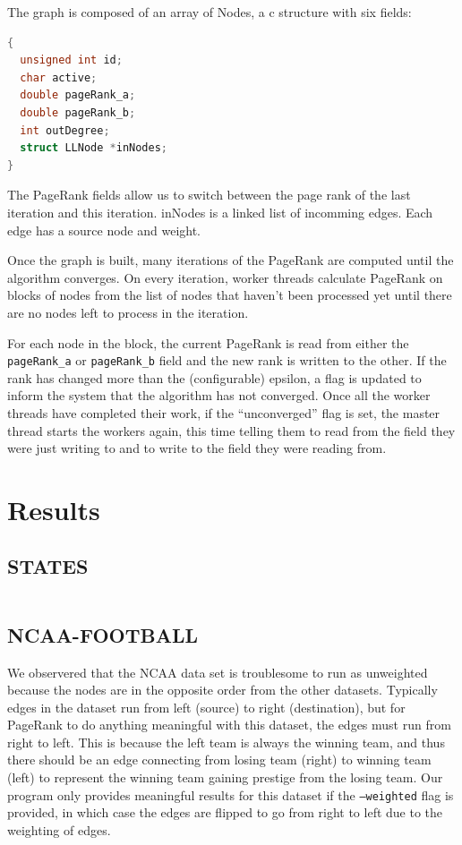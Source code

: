 \documentclass{report}
\newcommand{\results}[1]{\begin{longtabu}{rll}
                           
                         \end{longtabu}\clearpage}
\newcommand{\pagerank}{PageRank }
\begin{document}
The graph is composed of an array of Nodes, a c structure with six fields:
\begin{lstlisting}[language=C]
{
  unsigned int id;
  char active;
  double pageRank_a;
  double pageRank_b;
  int outDegree;
  struct LLNode *inNodes;
}
\end{lstlisting}

The \pagerank fields allow us to switch between the page rank of the last
iteration and this iteration. inNodes is a linked list of incomming edges. Each
edge has a source node and weight.

Once the graph is built, many iterations of the \pagerank are computed until the
algorithm converges. On every iteration, worker threads calculate \pagerank
on blocks of nodes from the list of nodes that haven't been processed yet until
there are no nodes left to process in the iteration.

For each node in the block, the current \pagerank is read from either the
\texttt{pageRank\_a} or \texttt{pageRank\_b} field and the new rank is written
to the other. If the rank has changed more than the (configurable) epsilon, a
flag is updated to inform the system that the algorithm has not converged. Once
all the worker threads have completed their work, if the ``unconverged'' flag is
set, the master thread starts the workers again, this time telling them to read
from the field they were just writing to and to write to the field they were
reading from.

\section{Results}
\subsection{STATES}
\results{stateborders-results.tex}
\subsection{NCAA-FOOTBALL}
We observered that the NCAA data set is troublesome to run as unweighted because
the nodes are in the opposite order from the other datasets. Typically edges in
the dataset run from left (source) to right (destination), but for \pagerank to
do anything meaningful with this dataset, the edges must run from right to left.
This is because the left team is always the winning team, and thus there should
be an edge connecting from losing team (right) to winning team (left) to
represent the winning team gaining prestige from the losing team. Our program
only provides meaningful results for this dataset if the \texttt{--weighted}
flag is provided, in which case the edges are flipped to go from right to left
due to the weighting of edges.
\end{document}
